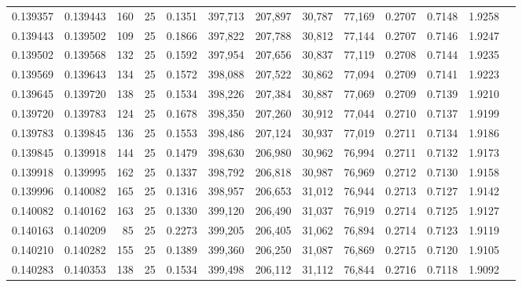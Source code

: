 \begin{tabular}{rrrrrrrrrrrrr}
0.139357 & 0.139443 &   160 &  25 &                                     0.1351 & 397,713 & 207,897 &  30,787 &  77,169 & 0.2707 & 0.7148 & 1.9258 \\
0.139443 & 0.139502 &   109 &  25 &                                     0.1866 & 397,822 & 207,788 &  30,812 &  77,144 & 0.2707 & 0.7146 & 1.9247 \\
0.139502 & 0.139568 &   132 &  25 &                                     0.1592 & 397,954 & 207,656 &  30,837 &  77,119 & 0.2708 & 0.7144 & 1.9235 \\
0.139569 & 0.139643 &   134 &  25 &                                     0.1572 & 398,088 & 207,522 &  30,862 &  77,094 & 0.2709 & 0.7141 & 1.9223 \\
0.139645 & 0.139720 &   138 &  25 &                                     0.1534 & 398,226 & 207,384 &  30,887 &  77,069 & 0.2709 & 0.7139 & 1.9210 \\
0.139720 & 0.139783 &   124 &  25 &                                     0.1678 & 398,350 & 207,260 &  30,912 &  77,044 & 0.2710 & 0.7137 & 1.9199 \\
0.139783 & 0.139845 &   136 &  25 &                                     0.1553 & 398,486 & 207,124 &  30,937 &  77,019 & 0.2711 & 0.7134 & 1.9186 \\
0.139845 & 0.139918 &   144 &  25 &                                     0.1479 & 398,630 & 206,980 &  30,962 &  76,994 & 0.2711 & 0.7132 & 1.9173 \\
0.139918 & 0.139995 &   162 &  25 &                                     0.1337 & 398,792 & 206,818 &  30,987 &  76,969 & 0.2712 & 0.7130 & 1.9158 \\
0.139996 & 0.140082 &   165 &  25 &                                     0.1316 & 398,957 & 206,653 &  31,012 &  76,944 & 0.2713 & 0.7127 & 1.9142 \\
0.140082 & 0.140162 &   163 &  25 &                                     0.1330 & 399,120 & 206,490 &  31,037 &  76,919 & 0.2714 & 0.7125 & 1.9127 \\
0.140163 & 0.140209 &    85 &  25 &                                     0.2273 & 399,205 & 206,405 &  31,062 &  76,894 & 0.2714 & 0.7123 & 1.9119 \\
0.140210 & 0.140282 &   155 &  25 &                                     0.1389 & 399,360 & 206,250 &  31,087 &  76,869 & 0.2715 & 0.7120 & 1.9105 \\
0.140283 & 0.140353 &   138 &  25 &                                     0.1534 & 399,498 & 206,112 &  31,112 &  76,844 & 0.2716 & 0.7118 & 1.9092 \\

\end{tabular}
